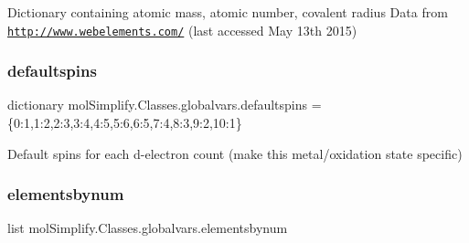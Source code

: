 Dictionary containing atomic mass, atomic number, covalent radius Data from \href{http://www.webelements.com/}{\tt http\+://www.\+webelements.\+com/} (last accessed May 13th 2015) 

\mbox{\label{namespacemolSimplify_1_1Classes_1_1globalvars_a1123abd692e68167072bb6a13c6bbc95}} 
\subsubsection{\texorpdfstring{defaultspins}{defaultspins}}
{\footnotesize\ttfamily dictionary mol\+Simplify.\+Classes.\+globalvars.\+defaultspins = \{0\+:\textquotesingle{}1\textquotesingle{},1\+:\textquotesingle{}2\textquotesingle{},2\+:\textquotesingle{}3\textquotesingle{},3\+:\textquotesingle{}4\textquotesingle{},4\+:\textquotesingle{}5\textquotesingle{},5\+:\textquotesingle{}6\textquotesingle{},6\+:\textquotesingle{}5\textquotesingle{},7\+:\textquotesingle{}4\textquotesingle{},8\+:\textquotesingle{}3\textquotesingle{},9\+:\textquotesingle{}2\textquotesingle{},10\+:\textquotesingle{}1\textquotesingle{}\}}



Default spins for each d-\/electron count (make this metal/oxidation state specific) 

\mbox{\label{namespacemolSimplify_1_1Classes_1_1globalvars_a257faf0e6e5695b5c8d0835360f7b054}} 
\subsubsection{\texorpdfstring{elementsbynum}{elementsbynum}}
{\footnotesize\ttfamily list mol\+Simplify.\+Classes.\+globalvars.\+elementsbynum}


